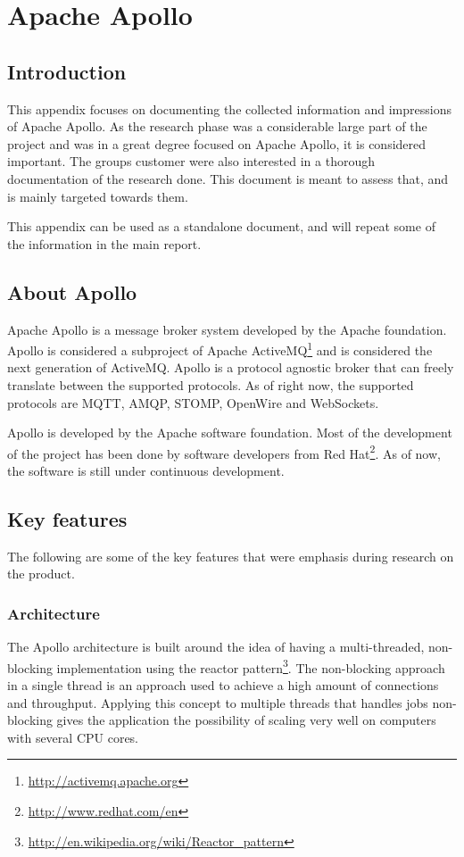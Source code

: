 \chapter{Apache Apollo}
\label{appendix:apache-apollo}

\section{Introduction}

This appendix focuses on documenting the collected information and impressions of Apache Apollo. As the research phase was a considerable large part of the project and was in a great degree focused on Apache Apollo, it is considered important. The groups customer were also interested in a thorough documentation of the research done. This document is meant to assess that, and is mainly targeted towards them.

This appendix can be used as a standalone document, and will repeat some of the information in the main report.

\section{About Apollo}
Apache Apollo is a message broker system developed by the Apache foundation. Apollo is considered a subproject of Apache ActiveMQ\footnote{\url{http://activemq.apache.org}} and is considered the next generation of ActiveMQ. Apollo is a protocol agnostic broker that can freely translate between the supported protocols. As of right now, the supported protocols are MQTT, AMQP, STOMP, OpenWire and WebSockets. 

Apollo is developed by the Apache software foundation. Most of the development of the project has been done by software developers from Red Hat\footnote{\url{http://www.redhat.com/en}}. As of now, the software is still under continuous development.

\section{Key features}
The following are some of the key features that were emphasis during research on the product. 

\subsection{Architecture}
The Apollo architecture is built around the idea of having a multi-threaded, non-blocking implementation using the reactor pattern\footnote{\url{http://en.wikipedia.org/wiki/Reactor_pattern}}. The non-blocking approach in a single thread is an approach used to achieve a high amount of connections and throughput. Applying this concept to multiple threads that handles jobs non-blocking gives the application the possibility of scaling very well on computers with several CPU cores.

